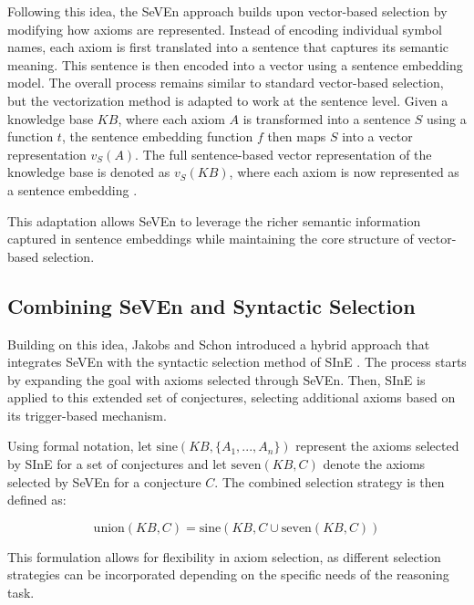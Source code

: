 \documentclass[english,version-2020-11]{uzl-thesis}
\begin{document}
Following this idea, the SeVEn approach builds upon vector-based selection by modifying how axioms are represented. Instead of encoding individual symbol names, each axiom is first translated into a sentence that captures its semantic meaning. This sentence is then encoded into a vector using a sentence embedding model. The overall process remains similar to standard vector-based selection, but the vectorization method is adapted to work at the sentence level. Given a knowledge base \( KB \), where each axiom \( A \) is transformed into a sentence \( S \) using a function \( t \), the sentence embedding function \( f \) then maps \( S \) into a vector representation \( v_S(A) \). The full sentence-based vector representation of the knowledge base is denoted as \( v_S(KB) \), where each axiom is now represented as a sentence embedding \cite{Schon2024}.

This adaptation allows SeVEn to leverage the richer semantic information captured in sentence embeddings while maintaining the core structure of vector-based selection.

\subsection{Combining SeVEn and Syntactic Selection}

Building on this idea, Jakobs and Schon introduced a hybrid approach that integrates SeVEn with the syntactic selection method of SInE \cite{Schon2024}. The process starts by expanding the goal with axioms selected through SeVEn. Then, SInE is applied to this extended set of conjectures, selecting additional axioms based on its trigger-based mechanism. 

Using formal notation, let \( \text{sine}(KB, \{A_1, ..., A_n\}) \) represent the axioms selected by SInE for a set of conjectures and let \( \text{seven}(KB, C) \) denote the axioms selected by SeVEn for a conjecture \( C \). The combined selection strategy is then defined as:

\begin{definition}
    \begin{equation}
        \text{union}(KB, C) = \text{sine}(KB, C \cup \text{seven}(KB, C))
    \end{equation}
\end{definition}

This formulation allows for flexibility in axiom selection, as different selection strategies can be incorporated depending on the specific needs of the reasoning task.
\end{document}
